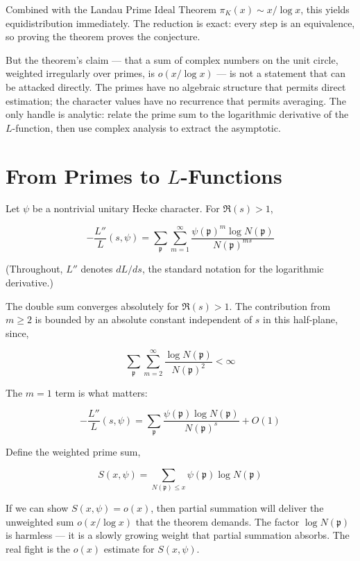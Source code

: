 \documentclass[12pt,a4paper]{article}
\begin{document}
\begin{quote}
\end{quote}

Combined with the Landau Prime Ideal Theorem $\pi_K(x) \sim x/\log x$, this yields equidistribution immediately. The reduction is exact: every step is an equivalence, so proving the theorem proves the conjecture.

But the theorem's claim --- that a sum of complex numbers on the unit circle, weighted irregularly over primes, is $o(x/\log x)$ --- is not a statement that can be attacked directly. The primes have no algebraic structure that permits direct estimation; the character values have no recurrence that permits averaging. The only handle is analytic: relate the prime sum to the logarithmic derivative of the $L$-function, then use complex analysis to extract the asymptotic.

\section{From Primes to $L$-Functions}

Let $\psi$ be a nontrivial unitary Hecke character. For $\Re(s) > 1$,

\[
-\frac{L''}{L}(s, \psi) = \sum_{\mathfrak{p}} \sum_{m=1}^\infty \frac{\psi(\mathfrak{p})^m \log N(\mathfrak{p})}{N(\mathfrak{p})^{ms}}
\]

(Throughout, $L''$ denotes $dL/ds$, the standard notation for the logarithmic derivative.)

The double sum converges absolutely for $\Re(s) > 1$. The contribution from $m \geq 2$ is bounded by an absolute constant independent of $s$ in this half-plane, since,

\[
\sum_{\mathfrak{p}} \sum_{m=2}^\infty \frac{\log N(\mathfrak{p})}{N(\mathfrak{p})^{2}} < \infty
\]

The $m=1$ term is what matters:

\[
-\frac{L''}{L}(s, \psi) = \sum_{\mathfrak{p}} \frac{\psi(\mathfrak{p}) \log N(\mathfrak{p})}{N(\mathfrak{p})^{s}} + O(1)
\]

Define the weighted prime sum,

\[
S(x, \psi) = \sum_{N(\mathfrak{p}) \leq x} \psi(\mathfrak{p}) \log N(\mathfrak{p})
\]

If we can show $S(x, \psi) = o(x)$, then partial summation will deliver the unweighted sum $o(x/\log x)$ that the theorem demands. The factor $\log N(\mathfrak{p})$ is harmless --- it is a slowly growing weight that partial summation absorbs. The real fight is the $o(x)$ estimate for $S(x, \psi)$.
\end{document}
